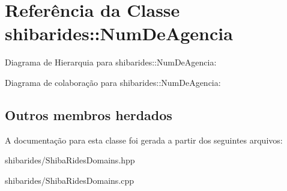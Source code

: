 \hypertarget{classshibarides_1_1NumDeAgencia}{}\section{Referência da Classe shibarides\+:\+:Num\+De\+Agencia}
\label{classshibarides_1_1NumDeAgencia}


Diagrama de Hierarquia para shibarides\+:\+:Num\+De\+Agencia\+:


Diagrama de colaboração para shibarides\+:\+:Num\+De\+Agencia\+:
\subsection*{Outros membros herdados}


A documentação para esta classe foi gerada a partir dos seguintes arquivos\+:\begin{DoxyCompactItemize}
\item 
shibarides/Shiba\+Rides\+Domains.\+hpp\item 
shibarides/Shiba\+Rides\+Domains.\+cpp\end{DoxyCompactItemize}
